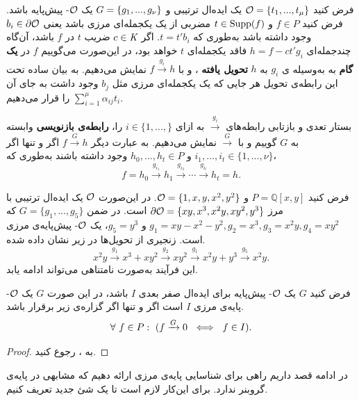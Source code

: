 فرض کنید 
${\mathcal O} = \{t_{1},...,t_{\mu}\}$
یک ایده‌ال ترتیبی و 
$G = \{g_{1},...,g_{\nu}\}$
یک 
${\mathcal O}$-
پیش‌پایه‌ باشد. فرض کنید
$f\in P$ 
و 
$t\in \operatorname{\mathrm{Supp}}(f)$
مضربی از یک یکجمله‌ای مرزی باشد یعنی 
$b_{i}\in \partial\mathcal{O}$
وجود داشته باشد به‌طوری که 
$t = t'b_{i}$.
 اگر 
 $c\in \textit{K}$
 ضریب 
 $t$
 در 
 $f$
 باشد، آن‌گاه چندجمله‌ای 
 $h = f - ct'g_{i}$
فاقد یکجمله‌ای 
$t$
خواهد بود، در این‌صورت می‌گوییم 
$f$
در 
\textbf{یک گام}
 به 
به‌وسیله ‌ی 
$g_{i}$
به 
$h$
\textbf{تحویل یافته }،
و با 
$f\xrightarrow{g_{i}}h$
نمایش می‌دهیم. به بیان ساده تحت این رابطه‌ی تحویل هر جایی که یک یکجمله‌ای مرزی مثل 
$b_{j}$
وجود داشت به جای آن 
$\sum_{i = 1}^{\mu}\alpha_{ij}t_{i}$
را قرار می‌دهیم. 

 بستار تعدی و بازتابی رابطه‌ها‌ی 
$\xrightarrow{g_{i}}$
به ازای 
$i\in\{1,...,\}$
را،
\textbf{رابطه‌ی بازنویسی}
وابسته به 
$G$
گوییم و با 
$\xrightarrow{G}$
نمایش می‌دهیم. به عبارت دیگر 
$f\xrightarrow{G}h$
اگر و تنها اگر 
$i_{1},...,i_{t}\in\{1,...,\nu\}$
و 
$h_{0},...,h_{t}\in P$
وجود داشته باشند به‌طوری که، 
$$f = h_{0}\xrightarrow{g_{i_{1}}}h_{1}\xrightarrow{g_{i_{2}}}\cdots\xrightarrow{g_{i_{t}}}h_{t} = h.$$

\begin{example}
فرض کنید 
$P = \mathbb{Q}[x,y]$
و
${\mathcal O} = \{1,x,y,x^{2},y^{2}\}$.
در این‌‌صورت 
${\mathcal O}$
یک ایده‌ال ترتیبی با مرز 
$\partial\mathcal{O} = \{xy, x^{3}, x^{2}y, xy^{2}, y^{3}\}$
است. در ضمن 
$G = \{g_{1},...,g_{5}\}$
که 
$g_{1} = xy - x^{2} - y^{2}, g_{2} = x^{3}, g_{3} = x^{2}y, g_{4} = xy^{2}$
و
$g_{5} = y^{3}$،
یک 
${\mathcal O}$-
پیش‌پایه‌ی مرزی است. زنجیری از تحویل‌ها در زیر نشان داده شده.
$$x^{2}y\xrightarrow{g_{1}}x^{3} +xy^{2}\xrightarrow{g_{2}}xy^{2}\xrightarrow{g_{1}}x^{2}y + y^{3}\xrightarrow{g_{5}}x^{2}y.$$
این فرآیند به‌صورت نامتناهی می‌تواند ادامه یابد.
\end{example}

\begin{proposition}
فرض کنید 
$G$
یک 
${\mathcal O}$-
پیش‌پایه برای ایده‌ال صفر بعدی 
$I$
باشد، در این صورت 
$G$
یک 
${\mathcal O}$-
پایه‌ی مرزی 
$I$
است اگر و تنها اگر گزاره‌ی زیر برقرار باشد. 
$$\forall \ f\in P: \ (f\xrightarrow{G}0 \ \iff \ f\in I).$$
\end{proposition}
\begin{proof}
به 
{\small \cite[ص.۴۳۳]{cca2_kreuzer}}،
رجوع کنید.
\end{proof}

در ادامه قصد داریم راهی برای شناسایی پایه‌ی مرزی ارائه دهیم که مشابهی در پایه‌ی گروبنر ندارد. برای این‌کار لازم است تا یک شئ جدید تعریف کنیم.

